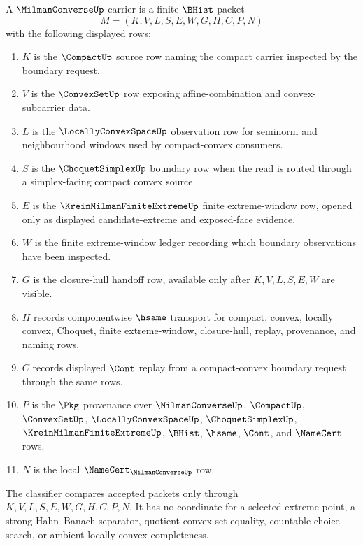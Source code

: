 \begin{definition}
\label{def:milman-converse-carrier}
A $\MilmanConverseUp$ carrier is a finite $\BHist$ packet
$$
M=(K,V,L,S,E,W,G,H,C,P,N)
$$
with the following displayed rows:
\begin{enumerate}
\item $K$ is the $\CompactUp$ source row naming the compact carrier inspected by the boundary request.
\item $V$ is the $\ConvexSetUp$ row exposing affine-combination and convex-subcarrier data.
\item $L$ is the $\LocallyConvexSpaceUp$ observation row for seminorm and neighbourhood windows used by compact-convex consumers.
\item $S$ is the $\ChoquetSimplexUp$ boundary row when the read is routed through a simplex-facing compact convex source.
\item $E$ is the $\KreinMilmanFiniteExtremeUp$ finite extreme-window row, opened only as displayed candidate-extreme and exposed-face evidence.
\item $W$ is the finite extreme-window ledger recording which boundary observations have been inspected.
\item $G$ is the closure-hull handoff row, available only after $K,V,L,S,E,W$ are visible.
\item $H$ records componentwise $\hsame$ transport for compact, convex, locally convex, Choquet, finite extreme-window, closure-hull, replay, provenance, and naming rows.
\item $C$ records displayed $\Cont$ replay from a compact-convex boundary request through the same rows.
\item $P$ is the $\Pkg$ provenance over $\MilmanConverseUp$, $\CompactUp$, $\ConvexSetUp$, $\LocallyConvexSpaceUp$, $\ChoquetSimplexUp$, $\KreinMilmanFiniteExtremeUp$, $\BHist$, $\hsame$, $\Cont$, and $\NameCert$ rows.
\item $N$ is the local $\NameCert_{\MilmanConverseUp}$ row.
\end{enumerate}
The classifier compares accepted packets only through $K,V,L,S,E,W,G,H,C,P,N$. It has no coordinate for a selected extreme point, a strong Hahn--Banach separator, quotient convex-set equality, countable-choice search, or ambient locally convex completeness.
\end{definition}

